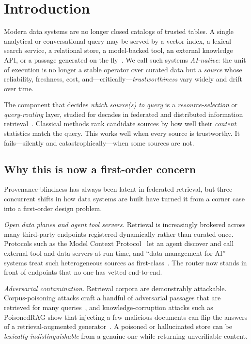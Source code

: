 \documentclass[preprint,12pt]{elsarticle}
\begin{document}
\linenumbers

\section{Introduction}

Modern data systems are no longer closed catalogs of trusted tables. A single
analytical or conversational query may be served by a vector index, a lexical
search service, a relational store, a model-backed tool, an external knowledge
API, or a passage generated on the fly~\cite{lewis2020rag,gao2023rag,
ooi2024neurdb,zhou2025llmdata}. We call such systems \emph{AI-native}: the unit of execution is
no longer a stable operator over curated data but a \emph{source} whose
reliability, freshness, cost, and---critically---\emph{trustworthiness} vary
widely and drift over time.

The component that decides \emph{which source(s) to query} is a
\emph{resource-selection} or \emph{query-routing} layer, studied for decades in
federated and distributed information retrieval~\cite{callan1995cori,
si2003redde,callan2000distributed,shokouhi2011federated}. Classical methods rank
candidate sources by how well their \emph{content} statistics match the query.
This works well when every source is trustworthy. It fails---silently and
catastrophically---when some sources are not.

\subsection{Why this is now a first-order concern}
Provenance-blindness has always been latent in federated retrieval, but three
concurrent shifts in how data systems are built have turned it from a corner case
into a first-order design problem.

\emph{Open data planes and agent tool servers.} Retrieval is increasingly
brokered across many third-party endpoints registered dynamically rather than
curated once. Protocols such as the Model Context Protocol~\cite{anthropic2024mcp}
let an agent discover and call external tool and data servers at run time, and
``data management for AI'' systems treat such heterogeneous sources as
first-class~\cite{ooi2024neurdb,zhou2025llmdata}. The router now stands in front
of endpoints that no one has vetted end-to-end.

\emph{Adversarial contamination.} Retrieval corpora are demonstrably attackable.
Corpus-poisoning attacks craft a handful of adversarial passages that are
retrieved for many queries~\cite{zhong2023corpus}, and knowledge-corruption
attacks such as PoisonedRAG show that injecting a few malicious documents can
flip the answers of a retrieval-augmented generator~\cite{zou2025poisonedrag}. A
poisoned or hallucinated store can be \emph{lexically indistinguishable} from a
genuine one while returning unverifiable content.
\end{document}
